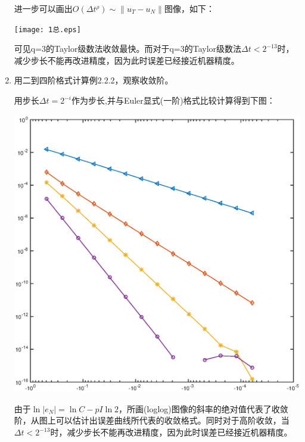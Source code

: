 \documentclass{ctexart}
\begin{document}
\begin{enumerate}
 进一步可以画出\(O(\Delta t^\rho) \sim \|u_T-u_N\|\)图像，如下：
 
 \centerline{\texttt{[image: 1总.eps]}}
 可见q=3的Taylor级数法收敛最快。而对于q=3的Taylor级数法\(\Delta t< 2^{-13}\)时，减少步长不能再改进精度，因为此时误差已经接近机器精度。
 
 \item
 用二到四阶格式计算例2.2.2，观察收敛阶。
 
用步长\(\Delta t =2^{-i}\)作为步长,并与Euler显式(一阶)格式比较计算得到下图：

\centerline{\includegraphics[width=5.5in]{last.eps}}

由于\(\ln |e_N|= \ln C -p I \ln 2\)，所画(loglog)图像的斜率的绝对值代表了收敛阶，从图上可以估计出误差曲线所代表的收敛格式。同时对于高阶收敛，当\(\Delta t< 2^{-13}\)时，减少步长不能再改进精度，因为此时误差已经接近机器精度。






\end{enumerate}
\end{document}
